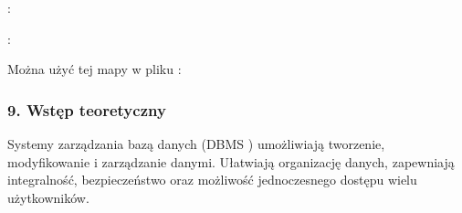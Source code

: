 \documentclass[letterpaper,10pt,polish]{sphinxmanual}
\begin{document}
\sphinxAtStartPar
{}

\begin{sphinxVerbatim}[commandchars=\\\{\}]
  
  
\end{sphinxVerbatim}

\sphinxAtStartPar
{} :

\begin{sphinxVerbatim}[commandchars=\\\{\}]
             
                
\end{sphinxVerbatim}

\sphinxAtStartPar
{} :

\begin{sphinxVerbatim}[commandchars=\\\{\}]
              
        
\end{sphinxVerbatim}

\sphinxAtStartPar
Można użyć tej mapy w pliku :

\begin{sphinxVerbatim}[commandchars=\\\{\}]
              
\end{sphinxVerbatim}


\subsubsection{9. Wstęp teoretyczny}
\label{\detokenize{rozdzial2/Konfiguracja_baz_danych/Konfiguracja_baz_danych:wstep-teoretyczny}}
\sphinxAtStartPar
Systemy zarządzania bazą danych (DBMS \textendash{} ) umożliwiają tworzenie, modyfikowanie i zarządzanie danymi. Ułatwiają organizację danych, zapewniają integralność, bezpieczeństwo oraz możliwość jednoczesnego dostępu wielu użytkowników.
\end{document}
